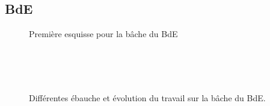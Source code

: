     \subsection{BdE}
        \begin{figure}[h!]
            \centering
            \caption{Première esquisse pour la bâche du BdE}
        \end{figure}

        \begin{figure}[h!]
            \centering
            \\ \hspace{1cm}
            \\ \hspace{1cm} 
            \\ \hspace{1cm}
            \caption{Différentes ébauche et évolution du travail sur la bâche du BdE.}
        \end{figure}    
            
